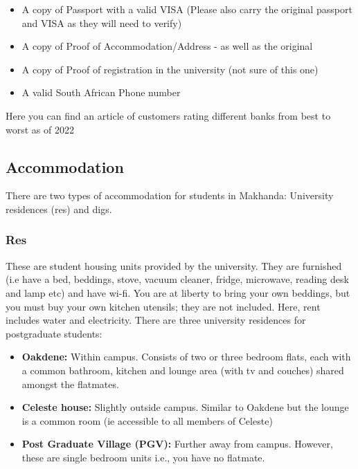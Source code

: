 \begin{itemize}
    \item A copy of Passport with a valid VISA (Please also carry the original passport and VISA as they will need to verify)
    \item A copy of Proof of Accommodation/Address - as well as the original
    \item A copy of Proof of registration in the university (not sure of this one)
    \item A valid South African Phone number
\end{itemize}
Here you can find an article of customers rating different banks from best to worst as of 2022






\subsection{Accommodation}
There are two types of accommodation for students in Makhanda: University residences (res) and digs.

\subsubsection*{Res}
These are student housing units provided by the university. They are furnished (i.e have a bed, beddings, stove, vacuum cleaner, fridge, microwave, reading desk and lamp etc) and have wi-fi. You are at liberty to bring your own beddings, but you must buy your own kitchen utensils; they are not included. Here, rent includes water and electricity. There are three university residences for postgraduate students:

\begin{itemize}
    \item \textbf{Oakdene:} Within campus. Consists of two or three bedroom flats, each with a common bathroom, kitchen and lounge area (with tv and couches) shared amongst the flatmates.

    \item \textbf{Celeste house:} Slightly outside campus. Similar to Oakdene but the lounge is a common room (ie accessible to all members of Celeste)

    \item \textbf{Post Graduate Village (PGV):} Further away from campus. However, these are single bedroom units i.e., you have no flatmate.
\end{itemize}

